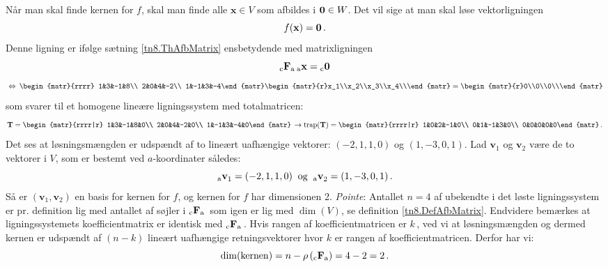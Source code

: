 Når man skal finde kernen for $f$, skal man finde alle $\mathbf x\in V$ som afbildes i $\bm{0}\in W$. Det vil sige at man skal løse vektorligningen 
$$
 f(\mathbf x)=\bm{0}\,.
$$
Denne ligning er ifølge sætning \ref{tn8.ThAfbMatrix} ensbetydende med matrixligningen  
$$
{_\mathrm{c}\mathbf{F}_\mathrm{a}}\,{_\mathrm{a}\mathbf{x}} = {_\mathrm{c}\mathbf{\bm{0}}}$$
$$\,\Leftrightarrow\,
\begin{matr}{rrrr}
1&3&-1&8\\
2&0&4&-2\\
1&-1&3&-4\end{matr}
\begin{matr}{r}x_1\\x_2\\x_3\\x_4\\\end{matr}
=\begin{matr}{r}0\\0\\0\\\end{matr}
$$
som svarer til et homogene lineære ligningssystem med totalmatricen:
$$
\mT=
\begin{matr}{rrrr|r}
1&3&-1&8&0\\
2&0&4&-2&0\\
1&-1&3&-4&0\end{matr}\,
\rightarrow \mathrm{trap}(\mT)=
\begin{matr}{rrrr|r}
1&0&2&-1&0\\
0&1&-1&3&0\\
0&0&0&0&0\end{matr}\,.
$$
Det ses at løsningsmængden er udspændt af to lineært uafhængige vektorer: $(-2,1,1,0)$ og $(1,-3,0,1)$. Lad  $\mathbf v_1$ og $\mathbf v_2$ være de to vektorer i $V$, som er bestemt ved $a$-koordinater således:
$${_\mathrm{a}\mathbf{v}}_1=(-2,1,1,0)\mathrm{\;\;og\;\;}{_\mathrm{a}\mathbf{v}}_2=(1,-3,0,1)\,.$$
Så er $(\mathbf v_1,\mathbf v_2)$ en basis for kernen for $f$, og kernen for $f$ har dimensionen 2.\bs
\textit{Pointe}: Antallet $n=4$ af ubekendte i det løste ligningssystem er pr. definition lig med antallet af søjler i ${_\mathrm{c}\mathbf{F}_\mathrm{a}}\,$ som igen er lig med $ \dim(V) $, se definition \ref{tn8.DefAfbMatrix}. Endvidere bemærkes at ligningssystemets koefficientmatrix er identisk med ${_\mathrm{c}\mathbf{F}_\mathrm{a}}\,$. Hvis rangen af koefficientmatricen er $k\,$, ved vi at løsningsmængden og dermed kernen er udspændt af $(n-k)$ lineært uafhængige retningsvektorer hvor $k$ er rangen af koefficientmatricen. Derfor har vi:
$$\dim(\mathrm{kernen})=n-\rho\,({_\mathrm{c}\mathbf{F}_\mathrm{a}})=4-2=2\,.$$

